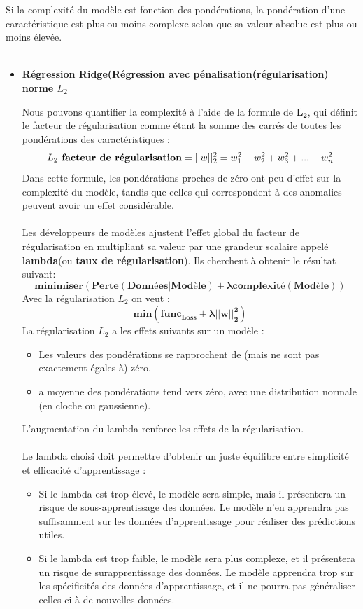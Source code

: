 \documentclass[french]{article}
\begin{document}
Si la complexité du modèle est fonction des pondérations, la pondération d'une caractéristique est plus ou moins complexe selon que sa valeur absolue est plus ou moins élevée.\\\\
\begin{itemize}[label=\textbullet, font=\LARGE \color{red}]

\item \textbf{Régression Ridge(Régression avec pénalisation(régularisation) norme $L_{2}$}

Nous pouvons quantifier la complexité à l'aide de la formule de 
$\bm{L_2}$, qui définit le facteur de régularisation comme étant la somme des carrés de toutes les pondérations des caractéristiques :	
$$L_{2}\text{\textbf{ facteur de régularisation}}=||w||^{2}_{2} = w^{2}_{1}+w^{2}_{2}+w^{2}_{3}+...+w^{2}_{n}$$
Dans cette formule, les pondérations proches de zéro ont peu d'effet sur la complexité du modèle, tandis que celles qui correspondent à des anomalies peuvent avoir un effet considérable.\\\\
Les développeurs de modèles ajustent l'effet global du facteur de régularisation en multipliant sa valeur par une grandeur scalaire appelé \textbf{lambda}(ou \textbf{taux de régularisation}). Ils cherchent à obtenir le résultat suivant: 
	$$\bm{minimiser(Perte(Données|Modèle)+\lambda complexité(Modèle))}$$
Avec la régularisation $L_{2}$ on veut  : $$\bm{min(func_{Loss}+\lambda ||w||^{2}_{2})}$$
La régularisation $L_{2}$ a les effets suivants sur un modèle : 
\begin{itemize}[label=\textbullet]
\item Les valeurs des pondérations se rapprochent de (mais ne sont pas exactement égales à) zéro.
\item a moyenne des pondérations tend vers zéro, avec une distribution normale (en cloche ou gaussienne).
\end{itemize}
L'augmentation du lambda renforce les effets de la régularisation.\\\\
Le lambda choisi doit permettre d'obtenir un juste équilibre entre simplicité et efficacité d'apprentissage :
\begin{itemize}[label=\textbullet]
\item Si le lambda est trop élevé, le modèle sera simple, mais il présentera un risque de sous-apprentissage des données. Le modèle n'en apprendra pas suffisamment sur les données d'apprentissage pour réaliser des prédictions utiles.
\item Si le lambda est trop faible, le modèle sera plus complexe, et il présentera un risque de surapprentissage des données. Le modèle apprendra trop sur les spécificités des données d'apprentissage, et il ne pourra pas généraliser celles-ci à de nouvelles données.
\end{itemize}



\end{itemize}
\end{document}
